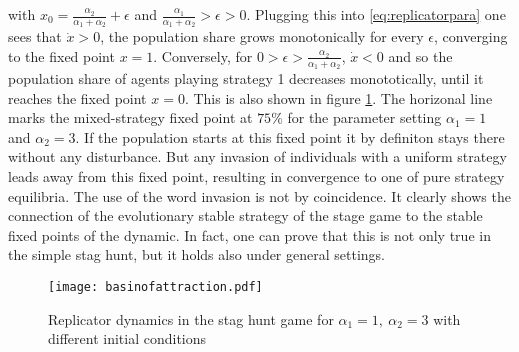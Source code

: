 \documentclass[11pt]{article}
\begin{document}
 with $x_0= \frac{\alpha_2}{\alpha_1+\alpha_2}+ \epsilon$ and 
 $\frac{\alpha_1}{\alpha_1+\alpha_2} > \epsilon > 0$. Plugging this into
 \eqref{eq:replicatorpara} one sees that $\dot{x} >0$, the population share
 grows monotonically for every $\epsilon$, converging to the fixed point 
 $x = 1$. Conversely, for $0 > \epsilon > \frac{\alpha_2}{\alpha_1+\alpha_2}$,
 $\dot{x} < 0$ and so the population share of agents 
 playing strategy 1 decreases monototically, until it reaches the 
 fixed point $x=0$. This is also shown in figure \ref{fig:basinofattraction}.
 The horizonal line marks the mixed-strategy fixed point at $75\%$ for the
 parameter setting $\alpha_1 = 1$ and $\alpha_2=3$. If the population starts
 at this fixed point it by definiton stays there without any disturbance. 
 But any invasion of individuals with a uniform strategy leads away from
 this fixed point, resulting in convergence to one of pure strategy equilibria.
 The use of the word invasion is not by coincidence. It clearly shows the 
 connection of the evolutionary stable strategy of the stage game to the 
 stable fixed points of the dynamic. In fact, one can prove that this is not
 only true in the simple stag hunt, but it holds also under general settings.
\begin{figure}
        \centering
        \texttt{[image: basinofattraction.pdf]}
        \caption[Replicator dynamic of the stag hunt game]{Replicator dynamics in the stag hunt game for 
                $\alpha_1=1,\ \alpha_2=3$ with different initial conditions}
                \label{fig:basinofattraction}
\end{figure}
\end{document}
